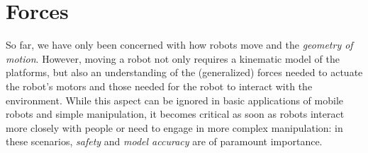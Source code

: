 \chapter{Forces}\label{ch:forces}

So far, we have only been concerned with how robots move and the \textsl{geometry of motion}.
However, moving a robot not only requires a kinematic model of the platforms, but also an understanding of the (generalized) forces needed to actuate the robot's motors and those needed for the robot to interact with the environment.
While this aspect can be ignored in basic applications of mobile robots and simple manipulation, it becomes critical as soon as robots interact more closely with people or need to engage in more complex manipulation: in these scenarios, \textsl{safety} and \textsl{model accuracy} are of paramount importance.

